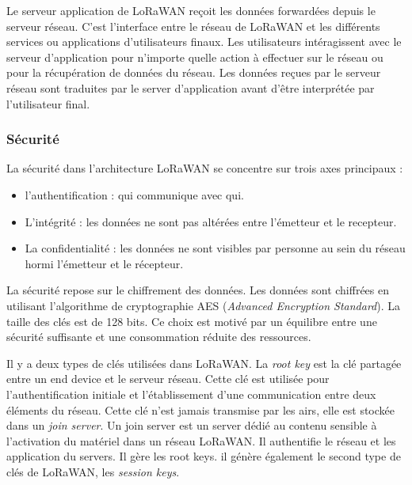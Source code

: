 \vspace{0.1cm}

Le serveur application de LoRaWAN reçoit les données forwardées depuis le serveur réseau. C'est l'interface entre le réseau de LoRaWAN et les différents services ou applications d'utilisateurs finaux. Les utilisateurs intéragissent avec le serveur d'application pour n'importe quelle action à effectuer sur le réseau ou pour la récupération de données du réseau. Les données reçues par le serveur réseau sont traduites par le server d'application avant d'être interprétée par l'utilisateur final.

\subsubsection{Sécurité}

La sécurité dans l'architecture LoRaWAN se concentre sur trois axes principaux :

\begin{itemize}
\item l'authentification : qui communique avec qui.
\item L'intégrité : les données ne sont pas altérées entre l'émetteur et le recepteur.
\item La confidentialité : les données ne sont visibles par personne au sein du réseau hormi l'émetteur et le récepteur. 
\end{itemize}

\vspace{0.1cm}

La sécurité repose sur le chiffrement des données. Les données sont chiffrées en utilisant l'algorithme de cryptographie AES (\textit{Advanced Encryption Standard}). La taille des clés est de 128 bits. Ce choix est motivé par un équilibre entre une sécurité suffisante et une consommation réduite des ressources\cite{loraes}.

\vspace{0.1cm}

Il y a deux types de clés utilisées dans LoRaWAN. La \textit{root key} est la clé partagée entre un end device et le serveur réseau. Cette clé est utilisée pour l'authentification initiale et l'établissement d'une communication entre deux éléments du réseau. Cette clé n'est jamais transmise par les airs, elle est stockée dans un \textit{join server}. Un join server est un server dédié au contenu sensible à l'activation du matériel dans un réseau LoRaWAN. Il authentifie le réseau et les application du servers. Il gère les root keys. il génère également le second type de clés de LoRaWAN, les \textit{session keys}.

